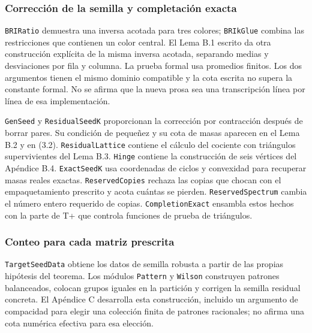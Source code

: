 \documentclass[spanish,11pt,a4paper]{article}
\begin{document}
\subsubsection{Corrección de la semilla y completación exacta}\label{correcciuxf3n-de-la-semilla-y-completaciuxf3n-exacta}

\texttt{BRIRatio} demuestra una inversa acotada para tres colores; \texttt{BRIk\allowbreak{}Glue} combina las restricciones que contienen un color central. El Lema B.1 escrito da otra construcción explícita de la misma inversa acotada, separando medias y desviaciones por fila y columna. La prueba formal usa promedios finitos. Los dos argumentos tienen el mismo dominio compatible y la cota escrita no supera la constante formal. No se afirma que la nueva prosa sea una transcripción línea por línea de esa implementación.

\texttt{Gen\allowbreak{}Seed} y \texttt{Residual\allowbreak{}Seed\allowbreak{}K} proporcionan la corrección por contracción después de borrar pares. Su condición de pequeñez y su cota de masas aparecen en el Lema B.2 y en (3.2). \texttt{Residual\allowbreak{}Lattice} contiene el cálculo del cociente con triángulos supervivientes del Lema B.3. \texttt{Hinge} contiene la construcción de seis vértices del Apéndice B.4. \texttt{Exact\allowbreak{}Seed\allowbreak{}K} usa coordenadas de ciclos y convexidad para recuperar masas reales exactas. \texttt{Reserved\allowbreak{}Copies} rechaza las copias que chocan con el empaquetamiento prescrito y acota cuántas se pierden. \texttt{Reserved\allowbreak{}Spectrum} cambia el número entero requerido de copias. \texttt{Completion\allowbreak{}Exact} ensambla estos hechos con la parte de T+ que controla funciones de prueba de triángulos.

\subsubsection{Conteo para cada matriz prescrita}\label{conteo-para-cada-matriz-prescrita}

\texttt{Target\allowbreak{}Seed\allowbreak{}Data} obtiene los datos de semilla robusta a partir de las propias hipótesis del teorema. Los módulos \texttt{Pattern} y \texttt{Wilson} construyen patrones balanceados, colocan grupos iguales en la partición y corrigen la semilla residual concreta. El Apéndice C desarrolla esta construcción, incluido un argumento de compacidad para elegir una colección finita de patrones racionales; no afirma una cota numérica efectiva para esa elección.
\end{document}
